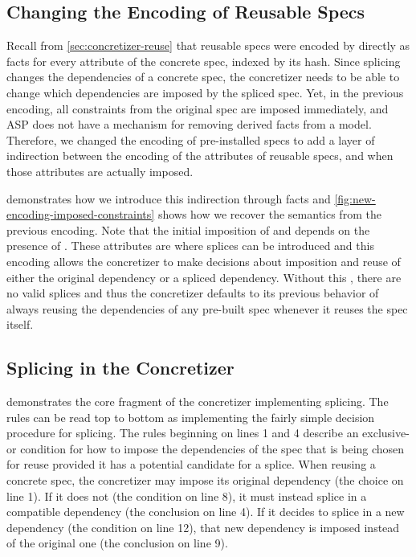 \subsection{Changing the Encoding of Reusable Specs}
\label{sec:impl-new-encoding}
Recall from \cref{sec:concretizer-reuse} that reusable specs were encoded by
directly as  facts for every attribute of the concrete
spec, indexed by its hash. Since splicing changes the dependencies of a concrete
spec, the concretizer needs to be able to change which dependencies are imposed
by the spliced spec. Yet, in the previous encoding, all constraints from the
original spec are imposed immediately, and ASP does not have a mechanism for
removing derived facts from a model. Therefore, we changed the encoding of
pre-installed specs to add a layer of indirection between the encoding of the
attributes of reusable specs, and when those attributes are actually imposed.
%

%
 demonstrates how we introduce this
indirection through  facts and
\cref{fig:new-encoding-imposed-constraints} shows how we recover the semantics
from the previous encoding. Note that the initial imposition of  and
 depends on the presence of
. These attributes are where splices can be
introduced and this encoding allows the concretizer to make decisions about
imposition and reuse of either the original dependency or a spliced dependency.
Without this , there are no valid splices and
thus the concretizer defaults to its previous behavior of always reusing the
dependencies of any pre-built spec whenever it reuses the spec itself.
%
\subsection{Splicing in the Concretizer}
\label{sec:impl-splice-concretizer}

%
 demonstrates the core fragment of the concretizer
implementing splicing. The rules can be read top to bottom as implementing the
fairly simple decision procedure for splicing. The rules beginning on lines 1
and 4 describe an exclusive-or condition for how to impose the dependencies of the spec
that is being chosen for reuse provided it has a potential candidate for a
splice. When reusing a concrete spec, the concretizer may impose its original
dependency (the choice on line 1). If it does not (the condition on line 8), it
must instead splice in a compatible dependency (the conclusion on line 4). If it
decides to splice in a new dependency (the condition on line 12), that new
dependency is imposed instead of the original one (the conclusion on line 9).

